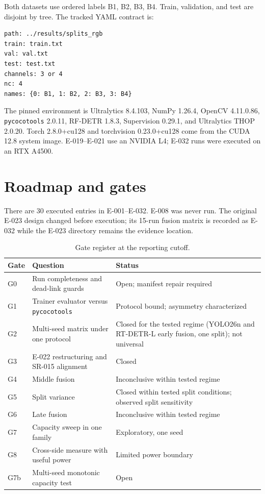 Both datasets use ordered labels B1, B2, B3, B4. Train, validation, and test
are disjoint by tree. The tracked YAML contract is:
\begin{verbatim}
path: ../results/splits_rgb
train: train.txt
val: val.txt
test: test.txt
channels: 3 or 4
nc: 4
names: {0: B1, 1: B2, 2: B3, 3: B4}
\end{verbatim}

The pinned environment is Ultralytics 8.4.103, NumPy 1.26.4, OpenCV
4.11.0.86, \texttt{pycocotools} 2.0.11, RF-DETR 1.8.3, Supervision 0.29.1,
and Ultralytics THOP 2.0.20. Torch 2.8.0+cu128 and torchvision 0.23.0+cu128
come from the CUDA 12.8 system image. E-019--E-021 use an NVIDIA L4; E-032
runs were executed on an RTX A4500.

\section{Roadmap and gates}
\label{sec:roadmap}
There are 30 executed entries in E-001--E-032. E-008 was never run. The
original E-023 design changed before execution; its 15-run fusion matrix is
recorded as E-032 while the E-023 directory remains the evidence location.

\begin{table}[H]
\centering
\caption{Gate register at the reporting cutoff.}
\begin{tabularx}{\columnwidth}{L{0.12\columnwidth}Y L{0.18\columnwidth}}
\toprule
\textbf{Gate} & \textbf{Question} & \textbf{Status}\\
\midrule
G0 & Run completeness and dead-link guards & Open; manifest repair required\\
G1 & Trainer evaluator versus \texttt{pycocotools} & Protocol bound; asymmetry characterized\\
G2 & Multi-seed matrix under one protocol & Closed for the tested regime (YOLO26n and RT-DETR-L early fusion, one split); not universal\\
G3 & E-022 restructuring and SR-015 alignment & Closed\\
G4 & Middle fusion & Inconclusive within tested regime\\
G5 & Split variance & Closed within tested split conditions; observed split sensitivity\\
G6 & Late fusion & Inconclusive within tested regime\\
G7 & Capacity sweep in one family & Exploratory, one seed\\
G8 & Cross-side measure with useful power & Limited power boundary\\
G7b & Multi-seed monotonic capacity test & Open\\
\bottomrule
\end{tabularx}
\end{table}

